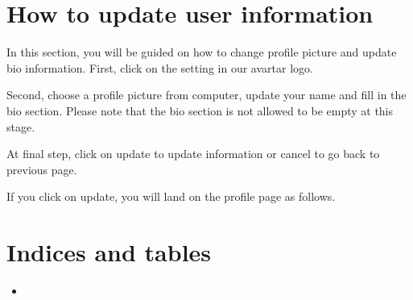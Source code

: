 \documentclass[letterpaper,10pt,english]{sphinxmanual}
\begin{document}
\sphinxstepscope


\chapter{How to update user information}
\label{\detokenize{pages/update-user-info:how-to-update-user-information}}\label{\detokenize{pages/update-user-info::doc}}
\sphinxAtStartPar
In this section, you will be guided on how to change profile picture and update bio information.
First, click on the setting in our avartar logo.

\noindent{}

\sphinxAtStartPar
Second, choose a profile picture from computer, update your name and fill in the bio section. Please note that the bio section is not allowed to be empty at this stage.

\sphinxAtStartPar
At final step, click on update to update information or cancel to go back to previous page.

\sphinxAtStartPar
If you click on update, you will land on the profile page as follows.

\noindent{}


\chapter{Indices and tables}
\label{\detokenize{index:indices-and-tables}}\begin{itemize}
\item {} 
\sphinxAtStartPar
{}

\end{itemize}



\renewcommand{\indexname}{Index}
\printindex
\end{document}
